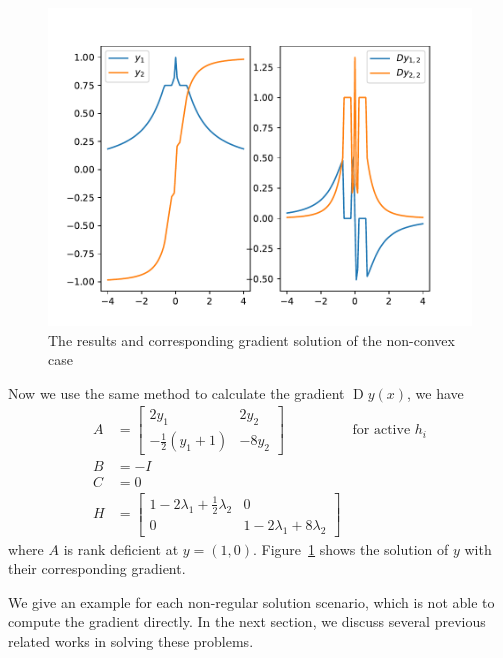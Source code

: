 \begin{figure}[t]
    \label{fig:non-convex-gradient}
    \centering
    \includegraphics[page=1, width=.8\textwidth]{figs/gradient-non-convex.pdf}
    \caption{The results and corresponding gradient solution of the non-convex case}
\end{figure}
\par Now we use the same method to calculate the gradient $\operatorname{D}y(x)$, we have
$$
\begin{array}{lll}
    A &= \begin{bmatrix}
         2y_1 & 2 y_2 \\ -\frac{1}{2} (y_1 + 1) & -8 y_2
         \end{bmatrix} & \text{for active $h_i$} \\
    B &= -I \\
    C &= 0 \\
    H &= \begin{bmatrix}
         1 - 2 \lambda_1 + \frac{1}{2} \lambda_2 & 0 \\
         0 & 1 - 2 \lambda_1 + 8 \lambda_2
         \end{bmatrix}
\end{array}
$$
where $A$ is rank deficient at $y = (1, 0)$. Figure~\ref{fig:non-convex-gradient} shows the solution of $y$ with their corresponding gradient. 
\par We give an example for each non-regular solution scenario, which is not able to compute the gradient directly. In the next section, we discuss several previous related works in solving these problems. 

